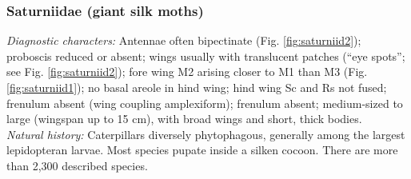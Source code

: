 \documentclass[letterpaper, 11pt]{article}
\begin{document}
\subsubsection{Saturniidae (giant silk moths)}
\noindent{}\textit{Diagnostic characters:} Antennae often bipectinate (Fig. \ref{fig:saturniid2}); proboscis reduced or absent; wings usually with translucent patches (``eye spots''; see Fig. \ref{fig:saturniid2}); fore wing M2 arising closer to M1 than M3 (Fig. \ref{fig:saturniid1}); no basal areole in hind wing; hind wing Sc and Rs not fused; frenulum absent (wing coupling amplexiform); frenulum absent; medium-sized to large (wingspan up to 15 cm), with broad wings and short, thick bodies.\\

\noindent{}\textit{Natural history:} Caterpillars diversely phytophagous, generally among the largest lepidopteran larvae. Most species pupate inside a silken cocoon. There are more than 2,300 described species.
\end{document}
